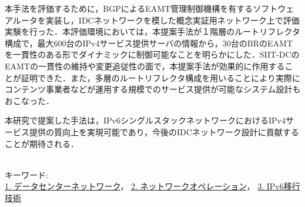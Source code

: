 本手法を評価するために，BGPによるEAMT管理制御機構を有するソフトウェアルータを実装し，IDCネットワークを模した概念実証用ネットワーク上で評価実験を行った．本評価環境においては，本提案手法が１階層のルートリフレクタ構成で，最大600台のIPv4サービス提供サーバの情報から，30台のBRのEAMTを一貫性のある形でダイナミックに制御可能なことを明らかにした．SIIT-DCのEAMTの一貫性の維持や変更追従性の面で，本提案手法が効果的に作用することが証明できた．また，多層のルートリフレクタ構成を用いることにより実際にコンテンツ事業者などが運用する規模でのサービス提供が可能なシステム設計もおこなった．

本研究で提案した手法は，IPv6シングルスタックネットワークにおけるIPv4サービス提供の質向上を実現可能であり，今後のIDCネットワーク設計に貢献することが期待される．



~ \\

キーワード:\\
\underline{1. データセンターネットワーク}，
\underline{2. ネットワークオペレーション}，
\underline{3. IPv6移行技術}
\begin{flushright}
\dept \\
\author
\end{flushright}
